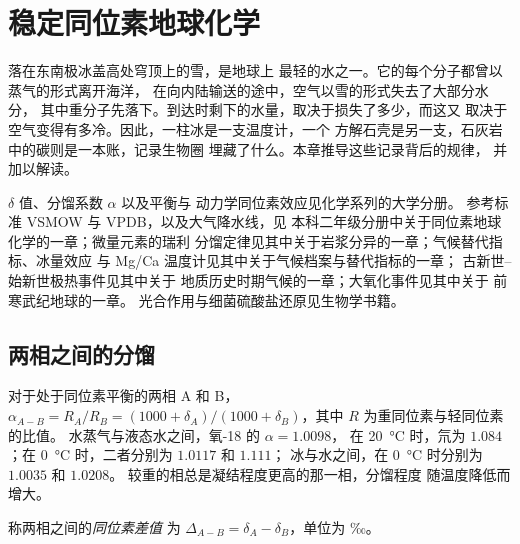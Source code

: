 \chapter{稳定同位素地球化学}\label{ch:b3:stable-isotopes}

落在东南极冰盖高处穹顶上的雪，是地球上
最轻的水之一。它的每个分子都曾以蒸气的形式离开海洋，
在向内陆输送的途中，空气以雪的形式失去了大部分水分，
其中重分子先落下。到达时剩下的水量，取决于损失了多少，而这又
取决于空气变得有多冷。因此，一柱冰是一支温度计，一个
方解石壳是另一支，石灰岩中的碳则是一本账，记录生物圈
埋藏了什么。本章推导这些记录背后的规律，
并加以解读。

\begin{recall}
$\delta$ 值、分馏系数 $\alpha$ 以及平衡与
动力学同位素效应见化学系列的大学分册。
参考标准 VSMOW 与 VPDB，以及大气降水线，见
本科二年级分册中关于同位素地球化学的一章；微量元素的瑞利
分馏定律见其中关于岩浆分异的一章；气候替代指标、冰量效应
与 Mg/Ca 温度计见其中关于气候档案与替代指标的一章；
古新世–始新世极热事件见其中关于
地质历史时期气候的一章；大氧化事件见其中关于
前寒武纪地球的一章。
光合作用与细菌硫酸盐还原见生物学书籍。
\end{recall}

\section{两相之间的分馏}\label{sec:b3:stable-isotopes:fractionation}

对于处于同位素平衡的两相 A 和 B，$\alpha_{A-B} = R_A/R_B =
(1000 + \delta_A)/(1000 + \delta_B)$，其中 $R$ 为重同位素与轻同位素的比值。
水蒸气与液态水之间，氧-18 的 $\alpha = 1.0098$，
在 \qty{20}{\celsius} 时，氘为 $1.084$；在 \qty{0}{\celsius} 时，二者分别为 $1.0117$ 和 $1.111$；
冰与水之间，在 \qty{0}{\celsius} 时分别为 $1.0035$ 和 $1.0208$。
较重的相总是凝结程度更高的那一相，分馏程度
随温度降低而增大。

\begin{definition}[同位素差值]\label{def:b3:stable-isotopes:big-delta}
称两相之间的\emph{同位素差值}
为 $\Delta_{A-B} = \delta_A - \delta_B$，单位为 ‰。
\end{definition}

